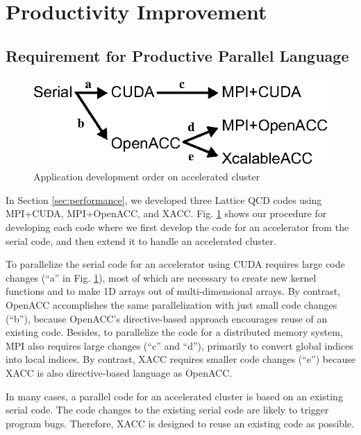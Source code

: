 \section{Productivity Improvement}
\subsection{Requirement for Productive Parallel Language}
\begin{figure}[h]
\centering
\includegraphics[scale=0.75,clip]{figs/howtocreate1.eps}
\caption{Application development order on accelerated cluster} \label{fig:howtocreate}
\end{figure}

In Section \ref{sec:performance},
we developed three Lattice QCD codes using MPI+CUDA, MPI+OpenACC, and XACC.
Fig. \ref{fig:howtocreate} shows our procedure for developing each code where
we first develop the code for an accelerator from the serial code,
and then extend it to handle an accelerated cluster.

To parallelize the serial code for an accelerator using CUDA requires large code changes (``a'' in Fig. \ref{fig:howtocreate}),
most of which are necessary to create new kernel functions and to make 1D arrays out of multi-dimensional arrays.
By contrast,
OpenACC accomplishes the same parallelization with just small code changes (``b''),
because OpenACC's directive-based approach encourages reuse of an existing code.
Besides,
to parallelize the code for a distributed memory system,
MPI also requires large changes (``c'' and ``d''),
primarily to convert global indices into local indices.
By contrast,
XACC requires smaller code changes (``e'') because XACC is also directive-based language as OpenACC.

In many cases,
a parallel code for an accelerated cluster is based on an existing serial code.
The code changes to the existing serial code are likely to trigger program bugs.
Therefore,
XACC is designed to reuse an existing code as possible.


